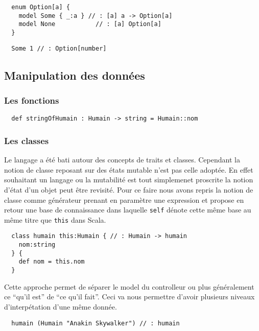 \documentclass[twoside,a4paper]{article}
\begin{document}
\lstset{language=Thicket}
\begin{lstlisting}
  enum Option[a] { 
    model Some { _:a } // : [a] a -> Option[a]
    model None           // : [a] Option[a]
  }
\end{lstlisting}

\lstset{language=Thicket}
\begin{lstlisting}
  Some 1 // : Option[number]
\end{lstlisting}

\subsection{Manipulation des données}

\subsubsection{Les fonctions} 

\lstset{language=Thicket}
\begin{lstlisting}
  def stringOfHumain : Humain -> string = Humain::nom
\end{lstlisting}

\subsubsection{Les classes}

Le langage a  été bati autour des concepts de  traits \cite{traits} et
classes. Cependant la  notion de classe reposant sur  des états mutable
n'est  pas  celle adoptée.   En  effet  souhaitant  un langage  ou  la
mutabilité est tout simplemenet proscrite  la notion d'état d'un objet
peut être  revisité.  Pour  ce faire  nous avons  repris la  notion de
classe comme générateur prenant en paramètre une expression et propose
en retour  une base  de connaissance dans  laquelle {\tt  self} dénote
cette même base au même titre que {\tt this} dans Scala.

\lstset{language=Thicket}
\begin{lstlisting}
  class humain this:Humain { // : Humain -> humain
    nom:string
  } {
    def nom = this.nom
  }
\end{lstlisting}

Cette  approche permet  de séparer le  model du  controlleur ou  plus
généralement  ce ``qu'il  est'' de  ``ce  qu'il fait''.  Ceci va  nous
permettre d'avoir plusieurs niveaux d'interpétation d'une même donnée.

\lstset{language=Thicket}
\begin{lstlisting}
  humain (Humain "Anakin Skywalker") // : humain
\end{lstlisting}
\end{document}
